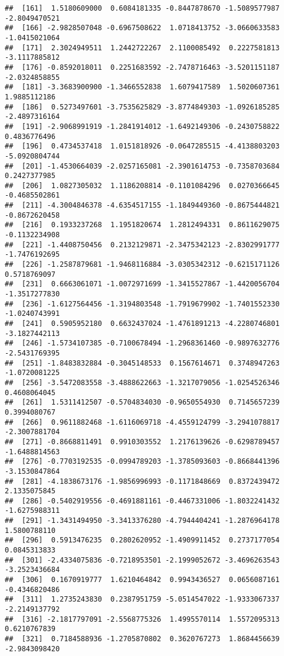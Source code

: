 \documentclass[
]{article}
\begin{document}
\begin{verbatim}
##  [161]  1.5180609000  0.6084181335 -0.8447878670 -1.5089577987 -2.8049470521
##  [166] -2.9828507048 -0.6967508622  1.0718413752 -3.0660633583 -1.0415021064
##  [171]  2.3024949511  1.2442722267  2.1100085492  0.2227581813 -3.1117885812
##  [176] -0.8592018011  0.2251683592 -2.7478716463 -3.5201151187 -2.0324858855
##  [181] -3.3683900900 -1.3466552838  1.6079417589  1.5020607361  1.9885112186
##  [186]  0.5273497601 -3.7535625829 -3.8774849303 -1.0926185285 -2.4897316164
##  [191] -2.9068991919 -1.2841914012 -1.6492149306 -0.2430758822  0.4836776496
##  [196]  0.4734537418  1.0151818926 -0.0647285515 -4.4138803203 -5.0920804744
##  [201] -1.4530664039 -2.0257165081 -2.3901614753 -0.7358703684  0.2427377985
##  [206]  1.0827305032  1.1186208814 -0.1101084296  0.0270366645 -0.4685502861
##  [211] -4.3004846378 -4.6354517155 -1.1849449360 -0.8675444821 -0.8672620458
##  [216]  0.1933237268  1.1951820674  1.2812494331  0.8611629075 -0.1132234908
##  [221] -1.4408750456  0.2132129871 -2.3475342123 -2.8302991777 -1.7476192695
##  [226] -1.2587879681 -1.9468116884 -3.0305342312 -0.6215171126  0.5718769097
##  [231]  0.6663061071 -1.0072971699 -1.3415527867 -1.4420056704 -1.3517277830
##  [236] -1.6127564456 -1.3194803548 -1.7919679902 -1.7401552330 -1.0240743991
##  [241]  0.5905952180  0.6632437024 -1.4761891213 -4.2280746801 -3.1827442113
##  [246] -1.5734107385 -0.7100678494 -1.2968361460 -0.9897632776 -2.5431769395
##  [251] -1.8483832884 -0.3045148533  0.1567614671  0.3748947263 -1.0720081225
##  [256] -3.5472083558 -3.4888622663 -1.3217079056 -1.0254526346  0.4608064045
##  [261]  1.5311412507 -0.5704834030 -0.9650554930  0.7145657239  0.3994080767
##  [266]  0.9611882468 -1.6116069718 -4.4559124799 -3.2941078817 -2.3007881704
##  [271] -0.8668811491  0.9910303552  1.2176139626 -0.6298789457 -1.6488814563
##  [276] -0.7703192535 -0.0994789203 -1.3785093603 -0.8668441396 -3.1530847864
##  [281] -4.1838673176 -1.9856996993 -0.1171848669  0.8372439472  2.1335075845
##  [286] -0.5402919556 -0.4691881161 -0.4467331006 -1.8032241432 -1.6275988311
##  [291] -1.3431494950 -3.3413376280 -4.7944404241 -1.2876964178  1.5800788110
##  [296]  0.5913476235  0.2802620952 -1.4909911452  0.2737177054  0.0845313833
##  [301] -2.4334075836 -0.7218953501 -2.1999052672 -3.4696263543 -3.2523436684
##  [306]  0.1670919777  1.6210464842  0.9943436527  0.0656087161 -0.4346820486
##  [311]  1.2735243830  0.2387951759 -5.0514547022 -1.9333067337 -2.2149137792
##  [316] -2.1817797091 -2.5568775326  1.4995570114  1.5572095313  0.6210767839
##  [321]  0.7184588936 -1.2705870802  0.3620767273  1.8684456639 -2.9843098420

\end{verbatim}
\end{document}
